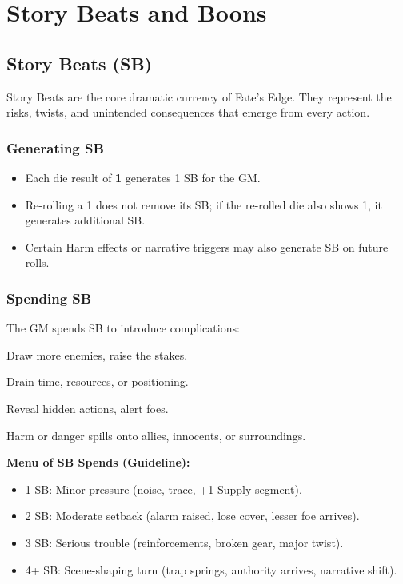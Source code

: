 

\section{Story Beats and Boons}

\subsection{Story Beats (SB)}
Story Beats are the core dramatic currency of Fate’s Edge. They represent the risks, twists, and unintended consequences that emerge from every action.

\subsubsection{Generating SB}
\begin{itemize}
  \item Each die result of \textbf{1} generates 1 SB for the GM.
  \item Re-rolling a 1 does not remove its SB; if the re-rolled die also shows 1, it generates additional SB.
  \item Certain Harm effects or narrative triggers may also generate SB on future rolls.
\end{itemize}

\subsubsection{Spending SB}
The GM spends SB to introduce complications:
\begin{description}[leftmargin=1.5em, style=nextline]
  \item[Escalation:] Draw more enemies, raise the stakes.
  \item[Exhaustion:] Drain time, resources, or positioning.
  \item[Exposure:] Reveal hidden actions, alert foes.
  \item[Collateral:] Harm or danger spills onto allies, innocents, or surroundings.
\end{description}

\textbf{Menu of SB Spends (Guideline):}
\begin{itemize}
  \item 1 SB: Minor pressure (noise, trace, +1 Supply segment).
  \item 2 SB: Moderate setback (alarm raised, lose cover, lesser foe arrives).
  \item 3 SB: Serious trouble (reinforcements, broken gear, major twist).
  \item 4+ SB: Scene-shaping turn (trap springs, authority arrives, narrative shift).
\end{itemize}

